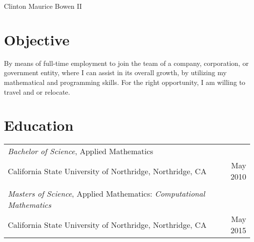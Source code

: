 \documentclass[12pt,table]{article}
\begin{document}
\par{
		{\sffamily\Huge Clinton Maurice Bowen II
	}}\\
 
 
 
\section*{\sffamily Objective}
By means of full-time employment to join the team of a company, corporation,
or government entity, where I can assist in its overall growth, by utilizing my mathematical and
programming skills.  For the right opportunity, I am willing to travel and or relocate.

\section*{\sffamily Education}

\begin{tabular}{lr}
\textit{Bachelor of Science}, Applied Mathematics&\\
California State University of Northridge, Northridge, CA &May 2010\\
&\\
\textit{Masters of Science}, Applied Mathematics: \textit{Computational Mathematics}&\\
California State University of Northridge, Northridge, CA &May 2015\\
\end{tabular}
\end{document}

